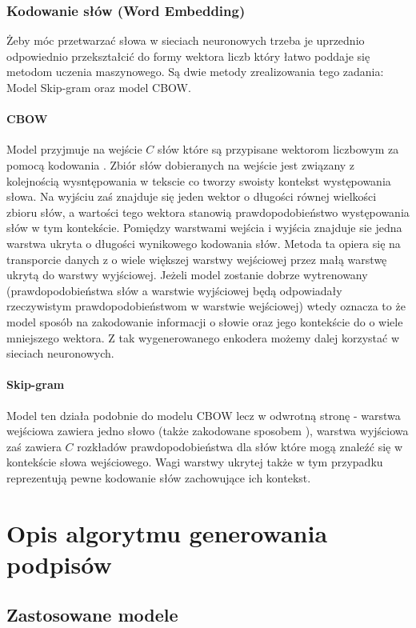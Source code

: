 \subsubsection{Kodowanie słów (Word Embedding)}
Żeby móc przetwarzać słowa w sieciach neuronowych trzeba je uprzednio odpowiednio przekształcić do formy wektora liczb który łatwo poddaje się metodom uczenia maszynowego. Są dwie metody zrealizowania tego zadania: Model Skip-gram oraz model CBOW.
\paragraph{CBOW}
Model przyjmuje na wejście $C$ słów które są przypisane wektorom liczbowym za pomocą kodowania . Zbiór słów dobieranych na wejście jest związany z kolejnością wysntępowania w tekscie co tworzy swoisty kontekst występowania słowa. Na wyjściu zaś znajduje się jeden wektor o długości równej wielkości zbioru słów, a wartości tego wektora stanowią prawdopodobieństwo występowania słów w tym kontekście. Pomiędzy warstwami wejścia i wyjścia znajduje sie jedna warstwa ukryta o długości wynikowego kodowania słów. Metoda ta opiera się na transporcie danych z o wiele większej warstwy wejściowej przez małą warstwę ukrytą do warstwy wyjściowej. Jeżeli model zostanie dobrze wytrenowany (prawdopodobieństwa słów a warstwie wyjściowej będą odpowiadały rzeczywistym prawdopodobieństwom w warstwie wejściowej) wtedy oznacza to że model  sposób na zakodowanie informacji o słowie oraz jego kontekście do o wiele mniejszego wektora. Z tak wygenerowanego enkodera możemy dalej korzystać w sieciach neuronowych. \cite[p.~1,3]{word-embed}
\paragraph{Skip-gram}
Model ten działa podobnie do modelu CBOW lecz w odwrotną stronę - warstwa wejściowa zawiera jedno słowo (także zakodowane sposobem ), warstwa wyjściowa zaś zawiera $C$ rozkładów prawdopodobieństwa dla słów które mogą znaleźć się w kontekście słowa wejściowego. Wagi warstwy ukrytej także w tym przypadku reprezentują pewne kodowanie słów zachowujące ich kontekst.

\section{Opis algorytmu generowania podpisów}
\subsection{Zastosowane modele}
